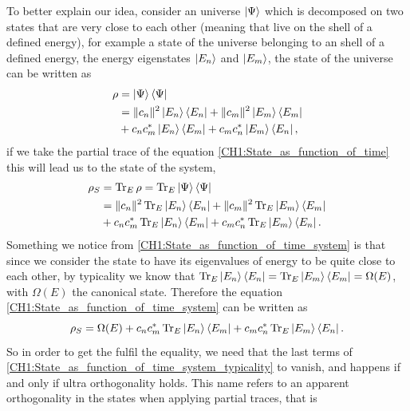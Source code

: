 \indent To better explain our idea, consider an universe $\mathinner{|{\Psi}\rangle}$ which is decomposed on two states that are very close to each other (meaning that live on the shell of a defined energy), for example a state of the universe belonging to an shell of a defined energy, the energy eigenstates $\mathinner{|{E_n}\rangle}$ and $\mathinner{|{E_m}\rangle}$, the state of the universe can be written as
\begin{equation}
\begin{aligned}
\rho &= \mathinner{|{\Psi}\rangle}\mathinner{\langle{\Psi}|}\\
&= \|c_n\|^2 \mathinner{|{E_n}\rangle}\mathinner{\langle{E_n}|} +  \|c_m\|^2 \mathinner{|{E_m}\rangle}\mathinner{\langle{E_m}|} \\
& + c_n c^{*}_m  \mathinner{|{E_n}\rangle}\mathinner{\langle{E_m}|}+ c_m c^{*}_n \mathinner{|{E_m}\rangle}\mathinner{\langle{E_n}|},
\end{aligned}
\label{CH1:State_as_function_of_time}
\end{equation}
if we take the partial trace of the equation \eqref{CH1:State_as_function_of_time} this will lead us to the state of the system,
\begin{equation}
\begin{aligned}
\rho_S &= \operatorname{Tr}_E \rho = \operatorname{Tr}_E  \mathinner{|{\Psi}\rangle}\mathinner{\langle{\Psi}|}\\
&= \|c_n\|^2\operatorname{Tr}_E  \mathinner{|{E_n}\rangle}\mathinner{\langle{E_n}|} +  \|c_m\|^2 \operatorname{Tr}_E \mathinner{|{E_m}\rangle}\mathinner{\langle{E_m}|} \\
& + c_n c^{*}_m  \operatorname{Tr}_E \mathinner{|{E_n}\rangle}\mathinner{\langle{E_m}|} + c_m c^{*}_n \operatorname{Tr}_E \mathinner{|{E_m}\rangle}\mathinner{\langle{E_n}|}.
\end{aligned}
\label{CH1:State_as_function_of_time_system}
\end{equation}
\indent Something we notice from \eqref{CH1:State_as_function_of_time_system} is that since we consider the state to have its eigenvalues of energy to be quite close to each other, by typicality we know that $\operatorname{Tr}_E \mathinner{|{E_n}\rangle}\mathinner{\langle{E_n}|} =\operatorname{Tr}_E \mathinner{|{E_m}\rangle}\mathinner{\langle{E_m}|} = \Omega(E)$, with $\Omega(E)$ the canonical state. Therefore the equation \eqref{CH1:State_as_function_of_time_system} can be written as
\begin{equation}
\rho_S= \Omega(E) + c_n c^{*}_m  \operatorname{Tr}_E \mathinner{|{E_n}\rangle}\mathinner{\langle{E_m}|} + c_m c^{*}_n \operatorname{Tr}_E \mathinner{|{E_m}\rangle}\mathinner{\langle{E_n}|}.
\label{CH1:State_as_function_of_time_system_typicality}
\end{equation}
\indent So in order to get the fulfil the equality, we need that the last terms of \eqref{CH1:State_as_function_of_time_system_typicality} to vanish, and happens if and only if ultra orthogonality holds. This name refers to an apparent orthogonality in the states when applying partial traces, that is

